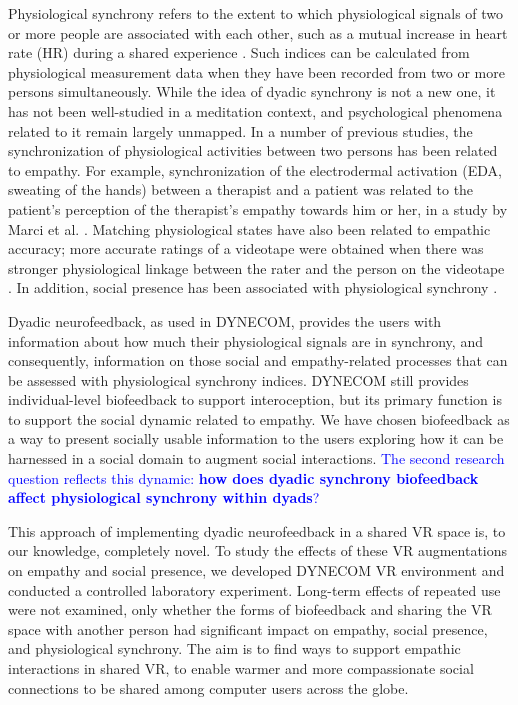 \documentclass[manuscript, review = false, screen]{acmart}
\begin{document}
Physiological synchrony refers to the extent to which physiological signals of two or more people are associated with each other, such as a mutual increase in heart rate (HR) during a shared experience \cite{Palumbo_Marraccini_Weyandt_Wilder-Smith_McGee_Liu_Goodwin_2016}. Such indices can be calculated from physiological measurement data when they have been recorded from two or more persons simultaneously. While the idea of dyadic synchrony is not a new one, it has not been well-studied in a meditation context, and psychological phenomena related to it remain largely unmapped. In a number of previous studies, the synchronization of physiological activities between two persons has been related to empathy. For example, synchronization of the electrodermal activation (EDA, sweating of the hands) between a therapist and a patient was related to the patient's perception of the therapist's empathy towards him or her, in a study by Marci et al. \cite{Marci2007}. Matching physiological states have also been related to empathic accuracy; more accurate ratings of a videotape were obtained when there was stronger physiological linkage between the rater and the person on the videotape \cite{levenson1992empathy}. In addition, social presence has been associated with physiological synchrony \cite{Jarvela_Katsyri_Ravaja_Chanel_Henttonen_2016, Ekman_Chanel_Jarvela_Kivikangas_Salminen_Ravaja_2012}. 

Dyadic neurofeedback, as used in DYNECOM, provides the users with information about how much their physiological signals are in synchrony, and consequently, information on those social and empathy-related processes that can be assessed with physiological synchrony indices. DYNECOM still provides individual-level biofeedback to support interoception, but its primary function is to support the social dynamic related to empathy. We have chosen biofeedback as a way to present socially usable information \cite{Van_Kleef_2010} to the users exploring how it can be harnessed in a social domain to augment social interactions. \textcolor{blue}{ The second research question reflects this dynamic: {\bf how does dyadic synchrony biofeedback affect physiological synchrony within dyads}?}

This approach of implementing dyadic neurofeedback in a shared VR space is, to our knowledge, completely novel. To study the effects of these VR augmentations on empathy and social presence, we developed DYNECOM VR environment and conducted a controlled laboratory experiment. Long-term effects of repeated use were not examined, only whether the forms of biofeedback and sharing the VR space with another person had significant impact on empathy, social presence, and physiological synchrony. The aim is to find ways to support empathic interactions in shared VR, to enable warmer and more compassionate social connections to be shared among computer users across the globe.
\end{document}
